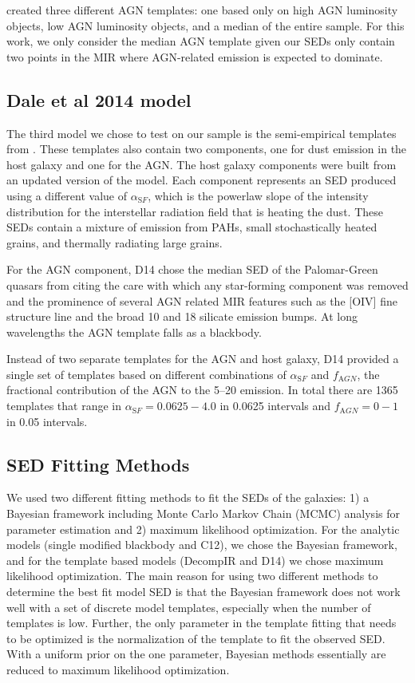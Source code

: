 \documentclass[fleqn, usenatbib]{mnras}
\begin{document}
\citet{Mullaney:2011yq} created three different AGN templates: one based only on high AGN luminosity objects, low AGN luminosity objects, and a median of the entire sample. For this work, we only consider the median AGN template given our SEDs only contain two points in the MIR where AGN-related emission is expected to dominate. 

\subsection{Dale et al 2014 model}
The third model we chose to test on our sample is the semi-empirical templates from \citet[][hereafter D14]{Dale:2014yq}. These templates also contain two components, one for dust emission in the host galaxy and one for the AGN. The host galaxy components were built from an updated version of the \citet{Dale:2002ty} model. Each component represents an SED produced using a different value of $\alpha_{\mathrm SF}$, which is the powerlaw slope of the intensity distribution for the interstellar radiation field that is heating the dust. These SEDs contain a mixture of emission from PAHs, small stochastically heated grains, and thermally radiating large grains.

For the AGN component, D14 chose the median SED of the Palomar-Green quasars from \citet{Shi:2013vn} citing the care with which any star-forming component was removed and the prominence of several AGN related MIR features such as the [OIV] fine structure line and the broad 10 and 18 \micron{} silicate emission bumps. At long wavelengths the AGN template falls as a blackbody.

Instead of two separate templates for the AGN and host galaxy, D14 provided a single set of templates based on different combinations of $\alpha_{\mathrm SF}$ and $f_{\mathrm AGN}$, the fractional contribution of the AGN to the 5--20 \micron{} emission. In total there are 1365 templates that range in $\alpha_{\mathrm SF}=0.0625-4.0$ in 0.0625 intervals and $f_{\mathrm AGN} = 0-1$ in 0.05 intervals.

\subsection{SED Fitting Methods}
We used two different fitting methods to fit the SEDs of the galaxies: 1) a Bayesian framework including Monte Carlo Markov Chain (MCMC) analysis for parameter estimation and 2) maximum likelihood optimization. For the analytic models (single modified blackbody and C12), we chose the Bayesian framework, and for the template based models (DecompIR and D14) we chose maximum likelihood optimization. The main reason for using two different methods to determine the best fit model SED is that the Bayesian framework does not work well with a set of discrete model templates, especially when the number of templates is low. Further, the only parameter in the template fitting that needs to be optimized is the normalization of the template to fit the observed SED. With a uniform prior on the one parameter, Bayesian methods essentially are reduced to maximum likelihood optimization.
\end{document}
